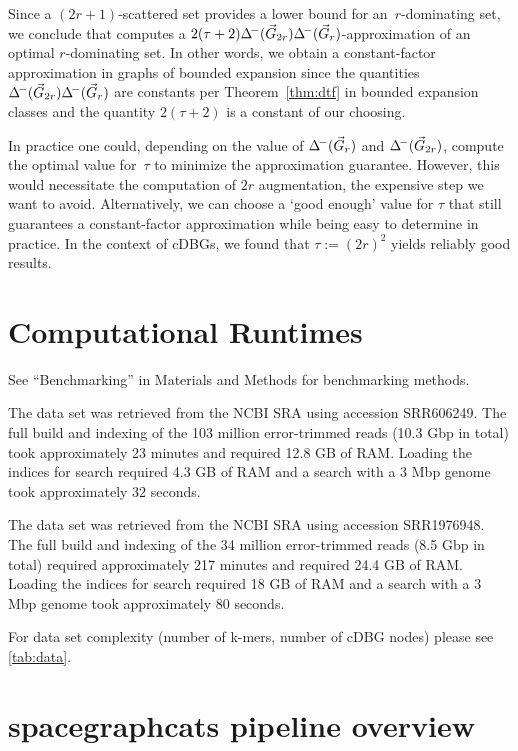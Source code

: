 \noindent
Since a $(2r+1)$-scattered set provides a lower bound for an~$r$-dominating
set, we conclude that  computes a
$2(\tau+2)\Delta^{\!-}(\vec{G}_{2r})\Delta^{\!-}(\vec{G}_r)$-approximation of an
optimal $r$-dominating set. In other words, we obtain a constant-factor
approximation in graphs of bounded expansion since the quantities $\Delta^{\!-}(\vec{G}_{2r})\Delta^{\!-}(\vec{G}_r)$ are constants per Theorem~\ref{thm:dtf} in bounded
expansion classes and the quantity $2(\tau+2)$ is a constant of our choosing.

In practice one could, depending on the value of $\Delta^{\!-}(\vec{G}_r)$
and $\Delta^{\!-}(\vec{G}_{2r})$, compute the optimal value for~$\tau$ to minimize the
approximation guarantee. However, this
would necessitate the computation of $2r$ augmentation, the expensive step we
want to avoid. Alternatively, we can choose a `good enough' value for $\tau$
that still guarantees a constant-factor approximation while being easy to
determine in practice. In the context of cDBGs, we found that
$\tau := (2r)^2$ yields reliably good results.

\section{Computational Runtimes}
\label{subsec:runtimes}

See ``Benchmarking'' in Materials and Methods for benchmarking methods.

The \podarv data set was retrieved from the NCBI SRA using accession
SRR606249.  The full build and indexing of the 103 million
error-trimmed reads (10.3 Gbp in total) took approximately 23 minutes
and required 12.8 GB of RAM. Loading the indices for search required
4.3 GB of RAM and a search with a 3 Mbp genome took approximately 32
seconds.

The \hu data set was retrieved from the NCBI SRA using accession
SRR1976948. The full build and indexing of the 34 million
error-trimmed reads (8.5 Gbp in total) required approximately 217
minutes and required 24.4 GB of RAM. Loading the indices for search
required 18 GB of RAM and a search with a 3 Mbp genome took
approximately 80 seconds.

For data set complexity (number of k-mers, number of cDBG nodes) please see
\autoref{tab:data}.

\section{spacegraphcats pipeline overview}
\label{subsec:sgc_pipeline}

